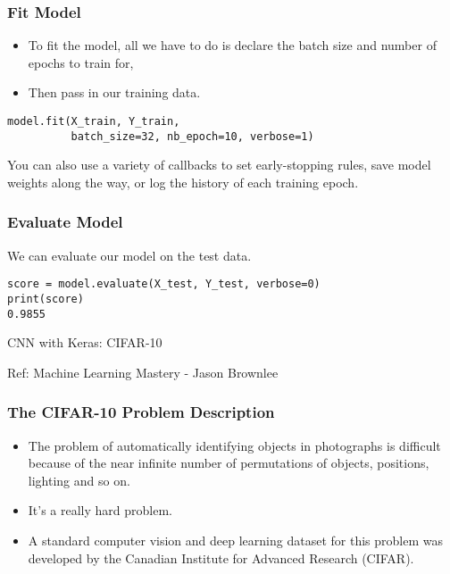 \begin{frame}[fragile] \frametitle{Fit Model}

\begin{itemize}
\item To fit the model, all we have to do is declare the batch size and number of epochs to train for, 
\item Then pass in our training data.
\end{itemize}
\begin{lstlisting}
model.fit(X_train, Y_train, 
          batch_size=32, nb_epoch=10, verbose=1)
\end{lstlisting}
You can also use a variety of callbacks to set early-stopping rules, save model weights along the way, or log the history of each training epoch.
\end{frame}

\begin{frame}[fragile] \frametitle{Evaluate Model}
We can evaluate our model on the test data.
\begin{lstlisting}
score = model.evaluate(X_test, Y_test, verbose=0)
print(score)
0.9855
\end{lstlisting}

\end{frame}



\begin{frame}
  \begin{center}
    {\Large CNN with Keras: CIFAR-10}
    
    {Ref: Machine Learning Mastery - Jason Brownlee}
  \end{center}
\end{frame}

\begin{frame}[fragile] \frametitle{The CIFAR-10 Problem Description}
\begin{itemize}
\item The problem of automatically identifying objects in photographs is difficult because of the near infinite number of permutations of objects, positions, lighting and so on. 
\item It's a really hard problem.
\item  A standard computer vision and deep learning dataset for this problem was developed by the Canadian Institute for Advanced Research (CIFAR).
\end{itemize}
\end{frame}



